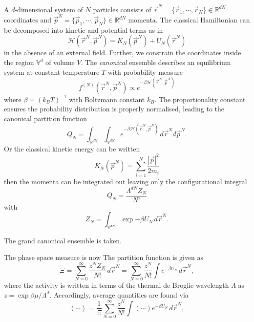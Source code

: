 A $d$-dimensional system of $N$ particles consists of $\vec{r}^N = \{\vec{r}_1, \cdots, \vec{r}_N\} \in \mathbb{R}^{dN}$ coordinates and $\vec{p}^N = \{\vec{p}_1, \cdots, \vec{p}_N\} \in \mathbb{R}^{dN}$ momenta.
The classical Hamiltonian can be decomposed into kinetic and potential terms as in
\begin{equation}
  \mathcal{H}(\vec{r}^N, \vec{p}^N) = K_N(\vec{p}^N) + U_N(\vec{r}^N)
\end{equation}
in the absence of an external field.
Further, we constrain the coordinates inside the region $\mathbb{V}^d$ of volume%
$V$.
The \emph{canonical} ensemble describes an equilibrium system at constant temperature $T$ with probability measure
\begin{equation}
  f^{(N)}(\vec{r}^N, \vec{p}^N) \propto e^{-\beta{\mathcal{H}(\vec{r}^N, \vec{p}^N)}}
\end{equation}
where $\beta = (k_B T)^{-1}$ with Boltzmann constant $k_B$.
The proportionality constant ensures the probability distribution is properly normalised, leading to the canonical partition function
\begin{equation}
  Q_N =
  \int_{\mathbb{R}^{dN}} \int_{\mathbb{V}^{dN}}
  e^{-\beta{\mathcal{H}(\vec{r}^N, \vec{p}^N)}}
  \, d\vec{r}^N d\vec{p}^N.
\end{equation}
Or the classical kinetic energy can be written
\[ K_N(\vec{p}^N) = \sum_{i=1}^N \frac{|\vec{p}|^2}{2m_i} \]
then the momenta can be integrated out leaving only the configurational integral
\begin{equation}
  Q_N = \frac{\Lambda^{dN} Z_N}{N!}
\end{equation}
with
\begin{equation*}
  Z_N =
  \int_{\mathbb{V}^{dN}}
  \exp{-\beta U_N}
  \, d\vec{r}^N.
\end{equation*}

The grand canonical ensemble is taken.

The phase space measure is now
The partition function is given as
\begin{equation}
  \Xi
  = \sum_{N=0}^\infty \frac{z^N Z_N}{N!} \, d\vec{r}^N
  = \sum_{N=0}^\infty \frac{z^N}{N!} \int e^{-\beta U_N} \, d\vec{r}^N,
\end{equation}
where the activity is written in terms of the thermal de Broglie wavelength $\Lambda$ as $z = \exp{\beta\mu} / \Lambda^d$.
Accordingly, average quantities are found via
\begin{equation}
  \left< \cdots \right> =
  \frac{1}{\Xi} \sum_{N=0}^\infty \frac{z^N}{N!} \int \left(\cdots\right) e^{-\beta U_N} \, d\vec{r}^N,
\end{equation}

